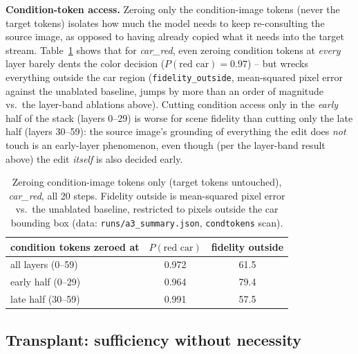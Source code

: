 \documentclass[10pt,twocolumn]{article}
\begin{document}
\textbf{Condition-token access.} Zeroing only the condition-image
tokens (never the target tokens) isolates how much the model needs to
keep re-consulting the source image, as opposed to having already
copied what it needs into the target stream. Table~\ref{tab:condtok}
shows that for \emph{car\_red}, even zeroing condition tokens at
\emph{every} layer barely dents the color decision ($P(\text{red
car})=0.97$) -- but wrecks everything outside the car region
(\texttt{fidelity\_outside}, mean-squared pixel error against the
unablated baseline, jumps by more than an order of magnitude vs.\ the
layer-band ablations above). Cutting condition access only in the
\emph{early} half of the stack (layers 0--29) is worse for scene
fidelity than cutting only the late half (layers 30--59): the source
image's grounding of everything the edit does \emph{not} touch is an
early-layer phenomenon, even though (per the layer-band result above)
the edit \emph{itself} is also decided early.

\begin{table}[t]
\centering
\small
\begin{tabular}{lcc}
\toprule
condition tokens zeroed at & $P(\text{red car})$ & fidelity outside \\
\midrule
all layers (0--59)   & 0.972 & 61.5 \\
early half (0--29)   & 0.964 & 79.4 \\
late half (30--59)   & 0.991 & 57.5 \\
\bottomrule
\end{tabular}
\caption{Zeroing condition-image tokens only (target tokens untouched),
\emph{car\_red}, all 20 steps. Fidelity outside is mean-squared pixel
error vs.\ the unablated baseline, restricted to pixels outside the car
bounding box (data: \texttt{runs/a3\_summary.json}, \texttt{condtokens}
scan).}
\label{tab:condtok}
\end{table}
\subsection{Transplant: sufficiency without necessity}\label{sec:swap}
\end{document}
